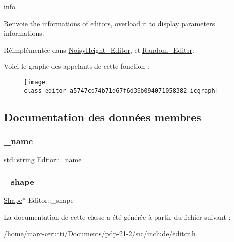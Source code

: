 info 

\begin{DoxyReturn}{Renvoie}
the informations of editors, overload it to display parameters informations. 
\end{DoxyReturn}


Réimplémentée dans \hyperlink{class_noisy_height___editor_a4749fe8cb3306252a8f48c8147854578}{Noisy\+Height\+\_\+\+Editor}, et \hyperlink{class_random___editor_aa194991b2926aeab96ad5470f549f087}{Random\+\_\+\+Editor}.

Voici le graphe des appelants de cette fonction \+:\nopagebreak
\begin{figure}[H]
\begin{center}
\leavevmode
\texttt{[image: class\_editor\_a5747cd74b71d67f6d39b094071058382\_icgraph]}
\end{center}
\end{figure}


\subsection{Documentation des données membres}
\mbox{\label{class_editor_a0ae04e135284b48561a538397106f42a}} 
\subsubsection{\texorpdfstring{\+\_\+name}{\_name}}
{\footnotesize\ttfamily std\+::string Editor\+::\+\_\+name\hspace{0.3cm}{\ttfamily [protected]}}

\mbox{\label{class_editor_ad9f31fcae91fb4a91b5ff5ecb4308bdf}} 
\subsubsection{\texorpdfstring{\+\_\+shape}{\_shape}}
{\footnotesize\ttfamily \hyperlink{class_shape}{Shape}$\ast$ Editor\+::\+\_\+shape\hspace{0.3cm}{\ttfamily [protected]}}



La documentation de cette classe a été générée à partir du fichier suivant \+:\begin{DoxyCompactItemize}
\item 
/home/marc-\/cerutti/\+Documents/pdp-\/21-\/2/src/include/\hyperlink{editor_8h}{editor.\+h}\end{DoxyCompactItemize}

